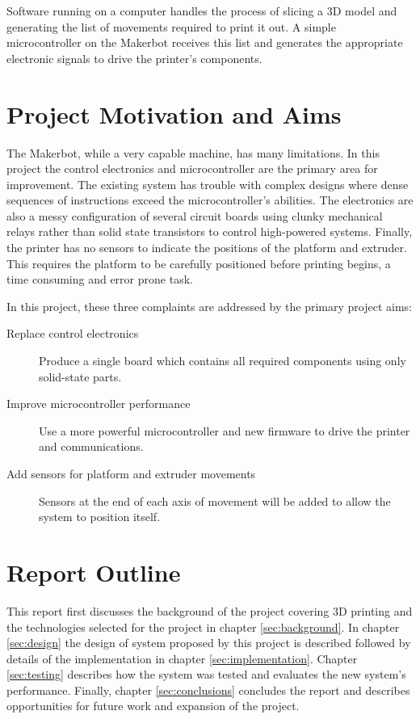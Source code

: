 		Software running on a computer handles the process of slicing a 3D model and
		generating the list of movements required to print it out.  A simple
		microcontroller on the Makerbot receives this list and generates the
		appropriate electronic signals to drive the printer's components.
		
	\section{Project Motivation and Aims}
		
		\label{sec:aims}
		
		The Makerbot, while a very capable machine, has many limitations. In this
		project the control electronics and microcontroller are the primary area for
		improvement. The existing system has trouble with complex designs where
		dense sequences of instructions exceed the microcontroller's abilities. The
		electronics are also a messy configuration of several circuit boards using
		clunky mechanical relays rather than solid state transistors to control
		high-powered systems. Finally, the printer has no sensors to indicate the
		positions of the platform and extruder. This requires the platform to be
		carefully positioned before printing begins, a time consuming and error
		prone task.
		
		In this project, these three complaints are addressed by the primary project
		aims:
		\begin{description}
			
			\item[Replace control electronics] Produce a single board which contains
			all required components using only solid-state parts.
			
			\item[Improve microcontroller performance] Use a more powerful
			microcontroller and new firmware to drive the printer and communications.
			
			\item[Add sensors for platform and extruder movements] Sensors at the end
			of each axis of movement will be added to allow the system to position
			itself.
			
		\end{description}
	
	\section{Report Outline}
		
		This report first discusses the background of the project covering 3D
		printing and the technologies selected for the project in chapter
		\ref{sec:background}. In chapter \ref{sec:design} the design of system
		proposed by this project is described followed by details of the
		implementation in chapter \ref{sec:implementation}. Chapter
		\ref{sec:testing} describes how the system was tested and evaluates the new
		system's performance. Finally, chapter \ref{sec:conclusions} concludes the
		report and describes opportunities for future work and expansion of the
		project.
